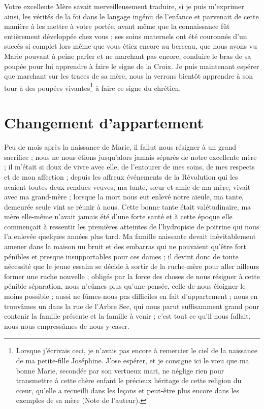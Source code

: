 \documentclass[11pt,a4paper]{report}
\begin{document}
Votre excellente Mère savait merveilleusement traduire, si je puis m'exprimer ainsi, les vérités de la foi dans le langage ingénu de l'enfance et parvenait de cette manière à les mettre à votre portée, avant même que la connaissance fût entièrement développée chez vous ; ses soins maternels ont été couronnés d'un succès si complet lors même que vous étiez encore au berceau, que nous avons vu Marie pouvant à peine parler et ne marchant pas encore, conduire le bras de sa poupée pour lui apprendre à faire le signe de la Croix. Je puis maintenant espérer que marchant sur les traces de sa mère, nous la verrons bientôt apprendre à son tour à des poupées vivantes\footnote{Lorsque j'écrivais ceci, je n'avais pas encore à remercier le ciel de la naissance de ma petite-fille Joséphine. J'ose espérer, et je consigne ici le vœu que ma bonne Marie, secondée par son vertueux mari, ne néglige rien pour transmettre à cette chère enfant le précieux héritage de cette religion du cœur, qu'elle a recueilli dans les leçons et peut-être plus encore dans les exemples de sa mère (Note de l'auteur).} à faire ce signe du chrétien.

\section*{Changement d'appartement}

Peu de mois après la naissance de Marie, il fallut nous résigner à un grand sacrifice ; nous ne nous étions jusqu'alors jamais séparés de notre excellente mère ; il m'était si doux de vivre avec elle, de l'entourer de mes soins, de mes respects et de mon affection ; depuis les affreux événements de la Révolution qui les avaient toutes deux rendues veuves, ma tante, sœur et amie de ma mère, vivait avec ma grand-mère ; lorsque la mort nous eut enlevé notre aïeule, ma tante, demeurée seule vint se réunir à nous. Cette bonne tante était valétudinaire, ma mère elle-même n'avait jamais été d'une forte santé et à cette époque elle commençait à ressentir les premières atteintes de l'hydropisie de poitrine qui nous l'a enlevée quelques années plus tard. Ma famille naissante devait inévitablement amener dans la maison un bruit et des embarras qui ne pouvaient qu'être fort pénibles et presque insupportables pour ces dames ; il devint donc de toute nécessité que le jeune essaim se décide à sortir de la ruche-mère pour aller ailleurs former une ruche nouvelle ; obligés par la force des choses de nous résigner à cette pénible séparation, nous n'eûmes plus qu'une pensée, celle de nous éloigner le moins possible ; aussi ne fûmes-nous pas difficiles en fait d'appartement ; nous en trouvâmes un dans la rue de l'Arbre Sec, qui nous parut suffisamment grand pour contenir la famille présente et la famille à venir ; c'est tout ce qu'il nous fallait, nous nous empressâmes de nous y caser.
\end{document}
